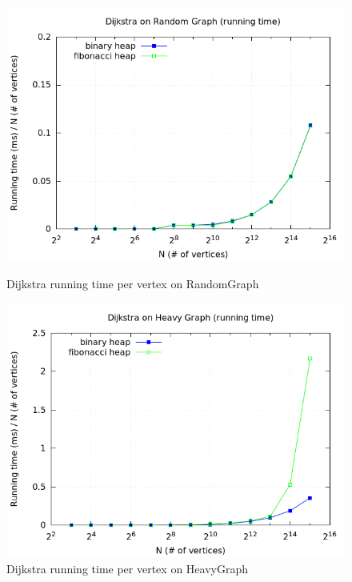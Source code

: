 \documentclass[a4paper,oneside,article,11pt]{memoir}
\begin{document}
\begin{figure}[H]
\centering
\begin{minipage}{0.48\columnwidth}
  \centering
  \includegraphics[width=\linewidth]{../res/dijkstra/d_random_rt_div_n.png}%
  \caption{Dijkstra running time per vertex on RandomGraph}
  \label{fig:dijkstra_random_rt_div_n}
\end{minipage}%
\hfill
\begin{minipage}{0.48\columnwidth}
  \centering
  \includegraphics[width=\linewidth]{../res/dijkstra/d_heavy_rt_div_n.png}%
  \caption{Dijkstra running time per vertex on HeavyGraph}
  \label{fig:dijkstra_heavy_rt_div_n}
\end{minipage}
\end{figure}
\end{document}
